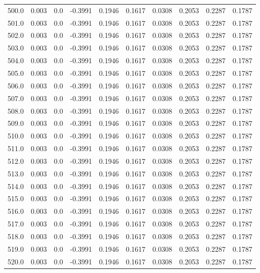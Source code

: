 \begin{longtable}{lrrrrrrrrr}
500.0 & 0.003 & 0.0 & -0.3991 & 0.1946 & 0.1617 & 0.0308 & 0.2053 & 0.2287 & 0.1787 \\
501.0 & 0.003 & 0.0 & -0.3991 & 0.1946 & 0.1617 & 0.0308 & 0.2053 & 0.2287 & 0.1787 \\
502.0 & 0.003 & 0.0 & -0.3991 & 0.1946 & 0.1617 & 0.0308 & 0.2053 & 0.2287 & 0.1787 \\
503.0 & 0.003 & 0.0 & -0.3991 & 0.1946 & 0.1617 & 0.0308 & 0.2053 & 0.2287 & 0.1787 \\
504.0 & 0.003 & 0.0 & -0.3991 & 0.1946 & 0.1617 & 0.0308 & 0.2053 & 0.2287 & 0.1787 \\
505.0 & 0.003 & 0.0 & -0.3991 & 0.1946 & 0.1617 & 0.0308 & 0.2053 & 0.2287 & 0.1787 \\
506.0 & 0.003 & 0.0 & -0.3991 & 0.1946 & 0.1617 & 0.0308 & 0.2053 & 0.2287 & 0.1787 \\
507.0 & 0.003 & 0.0 & -0.3991 & 0.1946 & 0.1617 & 0.0308 & 0.2053 & 0.2287 & 0.1787 \\
508.0 & 0.003 & 0.0 & -0.3991 & 0.1946 & 0.1617 & 0.0308 & 0.2053 & 0.2287 & 0.1787 \\
509.0 & 0.003 & 0.0 & -0.3991 & 0.1946 & 0.1617 & 0.0308 & 0.2053 & 0.2287 & 0.1787 \\
510.0 & 0.003 & 0.0 & -0.3991 & 0.1946 & 0.1617 & 0.0308 & 0.2053 & 0.2287 & 0.1787 \\
511.0 & 0.003 & 0.0 & -0.3991 & 0.1946 & 0.1617 & 0.0308 & 0.2053 & 0.2287 & 0.1787 \\
512.0 & 0.003 & 0.0 & -0.3991 & 0.1946 & 0.1617 & 0.0308 & 0.2053 & 0.2287 & 0.1787 \\
513.0 & 0.003 & 0.0 & -0.3991 & 0.1946 & 0.1617 & 0.0308 & 0.2053 & 0.2287 & 0.1787 \\
514.0 & 0.003 & 0.0 & -0.3991 & 0.1946 & 0.1617 & 0.0308 & 0.2053 & 0.2287 & 0.1787 \\
515.0 & 0.003 & 0.0 & -0.3991 & 0.1946 & 0.1617 & 0.0308 & 0.2053 & 0.2287 & 0.1787 \\
516.0 & 0.003 & 0.0 & -0.3991 & 0.1946 & 0.1617 & 0.0308 & 0.2053 & 0.2287 & 0.1787 \\
517.0 & 0.003 & 0.0 & -0.3991 & 0.1946 & 0.1617 & 0.0308 & 0.2053 & 0.2287 & 0.1787 \\
518.0 & 0.003 & 0.0 & -0.3991 & 0.1946 & 0.1617 & 0.0308 & 0.2053 & 0.2287 & 0.1787 \\
519.0 & 0.003 & 0.0 & -0.3991 & 0.1946 & 0.1617 & 0.0308 & 0.2053 & 0.2287 & 0.1787 \\
520.0 & 0.003 & 0.0 & -0.3991 & 0.1946 & 0.1617 & 0.0308 & 0.2053 & 0.2287 & 0.1787 \\

\end{longtable}
